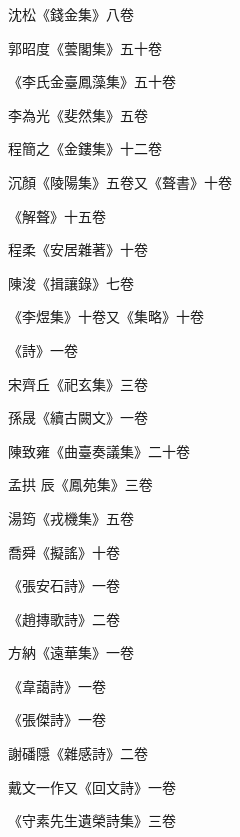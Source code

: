 \begin{pinyinscope}
 沈松《錢金集》八卷



 郭昭度《蕓閣集》五十卷



 《李氏金臺鳳藻集》五十卷



 李為光《斐然集》五卷



 程簡之《金鏤集》十二卷



 沉顏《陵陽集》五卷又《聱書》十卷



 《解聱》十五卷



 程柔《安居雜著》十卷



 陳浚《揖讓錄》七卷



 《李煜集》十卷又《集略》十卷



 《詩》一卷



 宋齊丘《祀玄集》三卷



 孫晟《續古闕文》一卷



 陳致雍《曲臺奏議集》二十卷



 孟拱
 辰《鳳苑集》三卷



 湯筠《戎機集》五卷



 喬舜《擬謠》十卷



 《張安石詩》一卷



 《趙摶歌詩》二卷



 方納《遠華集》一卷



 《韋藹詩》一卷



 《張傑詩》一卷



 謝磻隱《雜感詩》二卷



 戴文一作又《回文詩》一卷



 《守素先生遺榮詩集》三卷




\end{pinyinscope}
